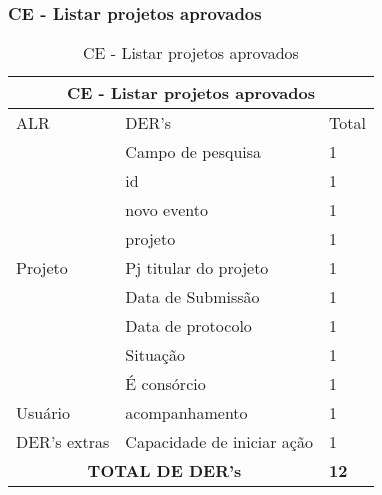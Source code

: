   \subsubsection{CE - Listar projetos aprovados}
\begin{table}[!h]
\centering
\caption{CE - Listar projetos aprovados}
\label{ce_listar_projetos_aprovados}
\begin{tabular}{|l|l|l|}
\multicolumn{3}{c}{CE - Listar projetos aprovados}                   \\\hline
ALR                      & DER's                      & Total         \\\hline
\multirow{9}{*}{Projeto} & Campo de pesquisa          & 1             \\ \cline{2-3}
                         & id                         & 1             \\ \cline{2-3}
                         & novo evento                & 1             \\\cline{2-3}
                         & projeto                    & 1             \\\cline{2-3}
                         & Pj titular do projeto      & 1             \\\cline{2-3}
                         & Data de Submissão          & 1             \\\cline{2-3}
                         & Data de protocolo          & 1             \\\cline{2-3}
                         & Situação                   & 1             \\\cline{2-3}
                         & É consórcio                & 1             \\\hline
Usuário                  & acompanhamento             & 1             \\\hline
DER's extras             & Capacidade de iniciar ação & 1             \\\hline
\multicolumn{2}{|c|}{\textbf{TOTAL DE DER's}}                   & \textbf{12}  \\ \hline
\end{tabular}
\end{table}

